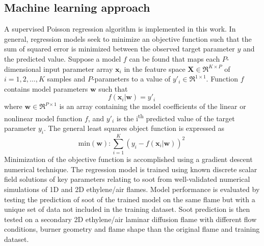 \documentclass[12pt]{CHT-20}
\begin{document}
\subsection{Machine learning approach}
A supervised Poisson regression algorithm is implemented in this work. In general, regression models seek to minimize an objective function such that the sum of squared error is minimized between the observed target parameter $y$ and the predicted value. Suppose a model $f$ can be found that maps each $P$-dimensional input parameter array $\mathbf{x}_i$ in the feature space $\mathbf{X} \in \Re^{K \times P}$ of $i=1,2,\dots,K$ samples and $P$-parameters to a value of $y'_i \in \Re^{1 \times 1}$. Function $f$ contains model parameters $\mathbf{w}$ such that
\begin{equation}
    f(\mathbf{x}_i|\mathbf{w}) = y'_i \ 
    \label{eq:modelFunction}
\end{equation}
where $\mathbf{w} \in \Re^{P \times 1}$ is an array containing the model coefficients of the linear or nonlinear model function $f$, and $y'_i$ is the i\textsuperscript{th} predicted value of the target parameter $y_i$. The general least squares object function is expressed as
\begin{equation}
    \text{min}({\mathbf{w}}): \sum^K_{i=1} \left(y_i - f(\mathbf{x}_i|\mathbf{w})\right)^2 \
    \label{eq:objectiveFunctionGeneral}
\end{equation}
Minimization of the objective function is accomplished using a gradient descent numerical technique. The regression model is trained using known discrete scalar field solutions of key parameters relating to soot from well-validated numerical simulations of 1D and 2D ethylene/air flames. Model performance is evaluated by testing the prediction of soot of the trained model on the same flame but with a unique set of data not included in the training dataset. Soot prediction is then tested on a secondary 2D ethylene/air laminar diffusion flame with different flow conditions, burner geometry and flame shape than the original flame and training dataset.
\end{document}
